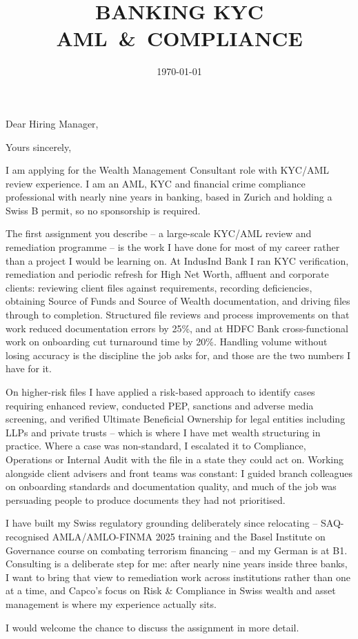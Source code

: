 \documentclass[11pt,a4paper,sans]{moderncv}
\title{BANKING \textbar{} KYC \textbar{} \mbox{AML \& COMPLIANCE}}
\begin{document}
\date{\today}
\opening{Dear Hiring Manager,}
\closing{Yours sincerely,}

\makelettertitle

I am applying for the Wealth Management Consultant role with KYC/AML review
experience. I am an AML, KYC and financial crime compliance professional with
nearly nine years in banking, based in Zurich and holding a Swiss B permit, so
no sponsorship is required.

The first assignment you describe -- a large-scale KYC/AML review and
remediation programme -- is the work I have done for most of my career rather
than a project I would be learning on. At IndusInd Bank I ran KYC verification,
remediation and periodic refresh for High Net Worth, affluent and corporate
clients: reviewing client files against requirements, recording deficiencies,
obtaining Source of Funds and Source of Wealth documentation, and driving files
through to completion. Structured file reviews and process improvements on that
work reduced documentation errors by 25\%, and at HDFC Bank cross-functional
work on onboarding cut turnaround time by 20\%. Handling volume without losing
accuracy is the discipline the job asks for, and those are the two numbers I
have for it.

On higher-risk files I have applied a risk-based approach to identify cases
requiring enhanced review, conducted PEP, sanctions and adverse media
screening, and verified Ultimate Beneficial Ownership for legal entities
including LLPs and private trusts -- which is where I have met wealth
structuring in practice. Where a case was non-standard, I escalated it to
Compliance, Operations or Internal Audit with the file in a state they could
act on. Working alongside client advisers and front teams was constant: I
guided branch colleagues on onboarding standards and documentation quality, and
much of the job was persuading people to produce documents they had not
prioritised.

I have built my Swiss regulatory grounding deliberately since relocating --
SAQ-recognised AMLA/AMLO-FINMA 2025 training and the Basel Institute on
Governance course on combating terrorism financing -- and my German is at B1.
Consulting is a deliberate step for me: after nearly nine years inside three
banks, I want to bring that view to remediation work across institutions rather
than one at a time, and Capco's focus on Risk \& Compliance in Swiss wealth and
asset management is where my experience actually sits.

I would welcome the chance to discuss the assignment in more detail.

\makeletterclosing
\end{document}
